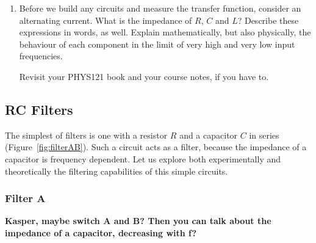 \documentclass{article}
\begin{document}
\begin{enumerate}[resume]
\item Before we build any circuits and measure the transfer function,
  consider an alternating current. What is the impedance of $R$, $C$
  and $L$? Describe these expressions in words, as well. Explain
  mathematically, but also physically, the behaviour of each component
  in the limit of very high and very low input frequencies.

  Revisit your PHYS121 book and your course notes, if you have to. %
\end{enumerate}
  
\subsection*{RC Filters}
The simplest of filters is one with a resistor $R$ and a capacitor $C$
in series (Figure~\ref{fig:filterAB}). Such a circuit acts as a
filter, because the impedance of a capacitor is frequency
dependent. Let us explore both experimentally and theoretically the
filtering capabilities of this simple circuits.

\subsubsection*{Filter A}

{\bf Kasper, maybe switch A and B? Then you can talk about the
  impedance of a capacitor, decreasing with f?}
\end{document}
